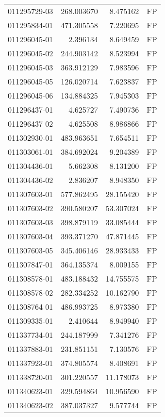 \begin{tabular}{lrrl}
011295729-03 &  268.003670 &     8.475162 &   FP \\
011295834-01 &  471.305558 &     7.220695 &   FP \\
011296045-01 &    2.396134 &     8.649459 &   FP \\
011296045-02 &  244.903142 &     8.523994 &   FP \\
011296045-03 &  363.912129 &     7.983596 &   FP \\
011296045-05 &  126.020714 &     7.623837 &   FP \\
011296045-06 &  134.884325 &     7.945303 &   FP \\
011296437-01 &    4.625727 &     7.490736 &   FP \\
011296437-02 &    4.625508 &     8.986866 &   FP \\
011302930-01 &  483.963651 &     7.654511 &   FP \\
011303061-01 &  384.692024 &     9.204389 &   FP \\
011304436-01 &    5.662308 &     8.131200 &   FP \\
011304436-02 &    2.836207 &     8.948350 &   FP \\
011307603-01 &  577.862495 &    28.155420 &   FP \\
011307603-02 &  390.580207 &    53.307024 &   FP \\
011307603-03 &  398.879119 &    33.085444 &   FP \\
011307603-04 &  393.371270 &    47.871445 &   FP \\
011307603-05 &  345.406146 &    28.933433 &   FP \\
011307847-01 &  364.135374 &     8.009155 &   FP \\
011308578-01 &  483.188432 &    14.755575 &   FP \\
011308578-02 &  282.334252 &    10.162790 &   FP \\
011308764-01 &  486.993725 &     8.973380 &   FP \\
011309335-01 &    2.410644 &     8.949940 &   FP \\
011337734-01 &  244.187999 &     7.341276 &   FP \\
011337883-01 &  231.851151 &     7.130576 &   FP \\
011337923-01 &  374.805574 &     8.408691 &   FP \\
011338720-01 &  301.220557 &    11.178073 &   FP \\
011340623-01 &  329.594864 &    10.956590 &   FP \\
011340623-02 &  387.037327 &     9.577744 &   FP \\

\end{tabular}

